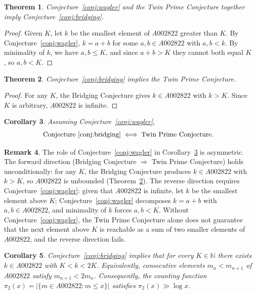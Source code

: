 \documentclass[12pt]{amsart}
\newtheorem{theorem}{Theorem}[section]
\newtheorem{corollary}[theorem]{Corollary}
\theoremstyle{definition}
\newtheorem{remark}[theorem]{Remark}
\newcommand{\N}{\mathbb{N}}
\begin{document}
\begin{theorem}
\label{thm:wagler-twin-implies-bridging}
Conjecture~\ref{conj:wagler} and the Twin Prime Conjecture together imply
Conjecture~\ref{conj:bridging}.
\end{theorem}

\begin{proof}
Given $K$, let $k$ be the smallest element of $A002822$ greater than $K$. By
Conjecture~\ref{conj:wagler}, $k = a + b$ for some $a, b \in A002822$ with $a, b < k$.
By minimality of $k$, we have $a, b \leq K$, and since $a + b > K$ they cannot both
equal $K$, so $a, b < K$.
\end{proof}

\begin{theorem}
\label{thm:bridging-implies-twin}
Conjecture~\ref{conj:bridging} implies the Twin Prime Conjecture.
\end{theorem}

\begin{proof}
For any $K$, the Bridging Conjecture gives $k \in A002822$ with $k > K$. Since $K$ is
arbitrary, $A002822$ is infinite.
\end{proof}

\begin{corollary}
\label{cor:equivalence}
Assuming Conjecture~\ref{conj:wagler},
\[
  \text{Conjecture~\ref{conj:bridging}} \iff \text{Twin Prime Conjecture}.
\]
\end{corollary}

\begin{remark}
\label{rem:wagler-role}
The role of Conjecture~\ref{conj:wagler} in Corollary~\ref{cor:equivalence} is
asymmetric. The forward direction (Bridging Conjecture $\Rightarrow$ Twin Prime
Conjecture) holds unconditionally: for any $K$, the Bridging Conjecture produces
$k \in A002822$ with $k > K$, so $A002822$ is unbounded
(Theorem~\ref{thm:bridging-implies-twin}). The reverse direction requires
Conjecture~\ref{conj:wagler}: given that $A002822$ is infinite, let $k$ be the
smallest element above $K$; Conjecture~\ref{conj:wagler} decomposes $k = a + b$
with $a, b \in A002822$, and minimality of $k$ forces $a, b < K$. Without
Conjecture~\ref{conj:wagler}, the Twin Prime Conjecture alone does not guarantee
that the next element above $K$ is reachable as a sum of two smaller elements of
$A002822$, and the reverse direction fails.
\end{remark}

\begin{corollary}
\label{cor:gap-bound}
Conjecture~\ref{conj:bridging} implies that for every $K \in \N$ there exists
$k \in A002822$ with $K < k < 2K$. Equivalently, consecutive elements
$m_n < m_{n+1}$ of $A002822$ satisfy $m_{n+1} < 2m_n$.
Consequently, the counting function $\pi_2(x) = |\{m \in A002822 : m \leq x\}|$
satisfies $\pi_2(x) \gg \log x$.
\end{corollary}
\end{document}
